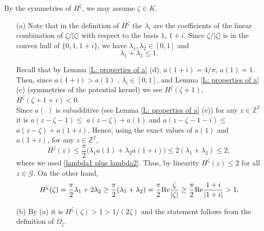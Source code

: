 \documentclass[11pt]{article}
\makeatletter
\renewenvironment{proof}[1][\proofname]{
   \par\pushQED{\qed}\normalfont
   \topsep6\p@\@plus6\p@\relax
   \trivlist\item[\hskip\labelsep\bfseries#1\@addpunct{.}]
   \ignorespaces
}{
   \popQED\endtrivlist\@endpefalse
}
\numberwithin{equation}{section}
\def\OZ{\Omega_{\zeta}}
\def\mydot{\boldsymbol{\cdot}}
\makeatother
\begin{document}
\begin{proof}[Proof of Lemma \ref{Properties of H}]
  \renewcommand{\qedsymbol}{}
  By the symmetries of $H^{\zeta}$, we may assume $\zeta \in K$.
  \begin{itemize}
    \item[(a)]
      Note that in the definition of 
      $H^{\zeta}$ the $\lambda_i$ are  
      the coefficients of the linear combination 
      of $\zeta /|\zeta|$ with respect to the basis $1$, $1+i$.
      Since $\zeta / |\zeta|$ is in the convex hull of 
      $\{0, 1, 1+i\}$, we have $\lambda_1, \lambda_2 \in [0,1]$ and 
      \begin{equation}\label{lambda1 plus lambda2}
        \lambda_1 + \lambda_2 \leq 1.
      \end{equation}

      Recall that by Lemma \ref{L: properties of a} (d),
      $a(1+i) = 4/ \pi$, $a(1) = 1$.
      Then, since $a(1+i) > a(1)$ , $\lambda_i \in [0,1]$, and Lemma \ref{L: properties of a} (c)
      (symmetries of the potential kernel) we see
      $H^{\zeta}(\zeta +1)$, 
      \hbox{$H^{\zeta}(\zeta +1+i) < 0$.}\\
      Since $a(\mydot)$ is subadditive (see Lemma \ref{L: properties of a} (e))  
      for any $z \in \mathbb{Z}^2$ it is 
      $a(z-\zeta-1) \leq$ \hbox{$a(z-\zeta) + a(1)$} and 
      $a(z-\zeta-1 -i) \leq$ \hbox{$a(z-\zeta) + a(1+i)$.} Hence, 
      using the exact values of $a(1)$ and $a(1+i)$, for any $z \in \mathbb{Z}^2$, 
      \begin{equation}\nonumber
        H^{\zeta}(z) 
        \leq \frac{\pi}{2} \big( \lambda_1 a(1) + \lambda_2 a(1+i) \big) 
        \leq 2(\lambda_1 + \lambda_2)
        \leq 2,
      \end{equation}
      where we used \eqref{lambda1 plus lambda2}. 
      Thus, by linearity $H^{\zeta}(z) \leq 2$ for all $z \in \mathcal{G}$. 
      On the other hand, 
      \begin{equation}\nonumber
        H^{\zeta}(\zeta) = 
        \frac{\pi}{2}\lambda_1 + 2 \lambda_2 
        \geq 
        \frac{\pi}{2}(\lambda_1 + \lambda_2)
          = \frac{\pi}{2} \text{Re} \frac{\zeta}{|\zeta|}\\
        \geq 
          \frac{\pi}{2} \text{Re} \frac{1+i}{|1+i|}
        > 1.  
      \end{equation}

    \item[(b)] 
      By (a) it is $H^{\zeta}(\zeta) >1> 1/(2\zeta)$ and
      the statement follows from the definition of $\OZ$. 


\end{itemize}
\end{proof}
\end{document}
